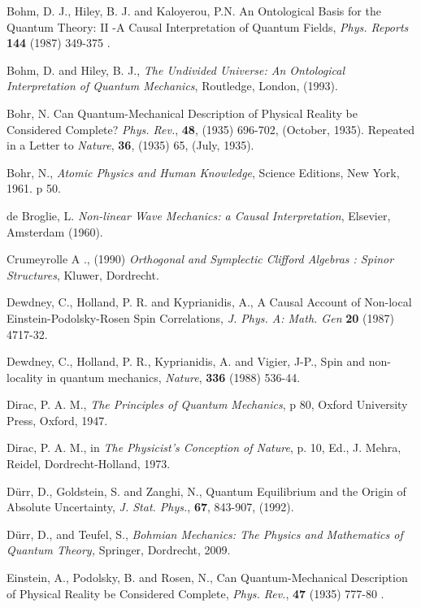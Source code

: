 \documentclass[11pt]{article}
\begin{document}
\begin{thebibliography}{99}
 Bohm, D. J., Hiley, B. J. and  Kaloyerou, P.N. An Ontological Basis for the Quantum Theory: II -A Causal Interpretation of Quantum Fields,   {\em Phys. Reports} {\bf 144} (1987) 349-375 .


 Bohm, D. and Hiley, B. J.,  {\em The Undivided Universe: An Ontological Interpretation of Quantum Mechanics}, Routledge, London, (1993).

   Bohr, N.  Can Quantum-Mechanical Description of Physical Reality be Considered Complete?
{\em Phys. Rev.},  {\bf 48},  (1935) 696-702,  (October, 1935).  Repeated in a  Letter to {\em Nature}, {\bf 36}, (1935) 65, (July, 1935).

 Bohr, N., {\em Atomic Physics and Human Knowledge}, Science Editions, New York, 1961. p 50.

  de Broglie, L.  {\em Non-linear Wave Mechanics: a Causal Interpretation}, Elsevier, Amsterdam (1960).

 Crumeyrolle A ., (1990) {\em Orthogonal and Symplectic Clifford Algebras : Spinor Structures}, Kluwer, Dordrecht.

 Dewdney, C., Holland, P. R. and Kyprianidis, A., A Causal Account of Non-local Einstein-Podolsky-Rosen Spin Correlations, {\em J. Phys. A: Math. Gen} {\bf 20} (1987)  4717-32.

 Dewdney, C., Holland, P. R., Kyprianidis, A. and Vigier, J-P., Spin and non-locality in quantum mechanics, {\em Nature}, {\bf 336} (1988) 536-44.

 Dirac, P. A. M., {\em The Principles of Quantum Mechanics}, p 80, Oxford University Press, Oxford, 1947.

 Dirac, P. A. M., in {\em The Physicist's Conception of Nature}, p. 10, Ed., J. Mehra, Reidel, Dordrecht-Holland, 1973.

 D\"{u}rr, D., Goldstein, S. and Zanghi, N., Quantum Equilibrium and the Origin of Absolute Uncertainty, {\em J. Stat. Phys.}, {\bf 67}, 843-907, (1992).

 D\"{u}rr, D., and Teufel, S., {\em Bohmian Mechanics: The Physics and Mathematics of Quantum Theory,} Springer, Dordrecht, 2009.

 Einstein, A., Podolsky, B. and Rosen, N., Can Quantum-Mechanical Description of Physical Reality be Considered Complete, {\em Phys. Rev.}, {\bf 47} (1935) 777-80 .



\end{thebibliography}
\end{document}
